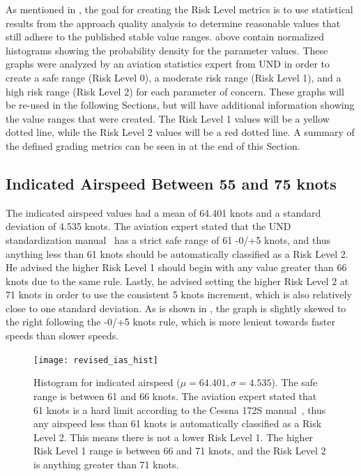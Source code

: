 	As mentioned in , the goal for creating the Risk Level metrics is to use statistical results from the approach quality analysis to determine reasonable values that still adhere to the published stable value ranges.   above contain normalized histograms showing the probability density for the parameter values.  These graphs were analyzed by an aviation statistics expert from UND in order to create a safe range (Risk Level 0), a moderate risk range (Risk Level 1), and a high risk range (Risk Level 2) for each parameter of concern.  These graphs will be re-used in the following Sections, but will have additional information showing the value ranges that were created.  The Risk Level 1 values will be a yellow dotted line, while the Risk Level 2 values will be a red dotted line.  A summary of the defined grading metrics can be seen in  at the end of this Section.
    
    	
    \subsection{Indicated Airspeed Between 55 and 75 knots}
    
          The indicated airspeed values had a mean of 64.401 knots and a standard deviation of 4.535 knots.  The aviation expert stated that the UND standardization manual~\cite{und_flight_manual} has a strict safe range of 61 -0/+5 knots, and thus anything less than 61 knots should be automatically classified as a Risk Level 2.  He advised the higher Risk Level 1 should begin with any value greater than 66 knots due to the same rule.  Lastly, he advised setting the higher Risk Level 2 at 71 knots in order to use the consistent 5 knots increment, which is also relatively close to one standard deviation.  As is shown in , the graph is slightly skewed to the right following the -0/+5 knots rule, which is more lenient towards faster speeds than slower speeds.

		\begin{figure}
			\centering
            \texttt{[image: revised\_ias\_hist]}
            \caption{Histogram for indicated airspeed ($\mu = 64.401, \sigma = 4.535$).  The safe range is between 61 and 66 knots.  The aviation expert stated that 61 knots is a hard limit according to the Cessna 172S manual~\cite{und_poh}, thus any airspeed less than 61 knots is automatically classified as a Risk Level 2.  This means there is not a lower Risk Level 1.  The higher Risk Level 1 range is between 66 and 71 knots, and the Risk Level 2 is anything greater than 71 knots.}
            \label{fig:revised_ias_hist}
		\end{figure}



